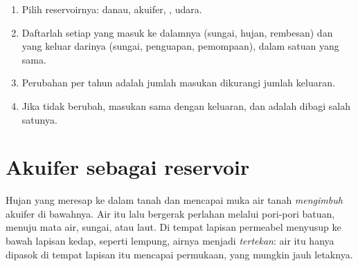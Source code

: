 \begin{method}\label{met:g10:freshwater-resources:budget}
\begin{enumerate}
  \item Pilih reservoirnya: danau, akuifer, , udara.
  \item Daftarlah setiap  yang masuk ke dalamnya (sungai, hujan,
        rembesan) dan yang keluar darinya (sungai, penguapan, pemompaan),
        dalam satuan yang sama.
  \item Perubahan  per tahun adalah jumlah masukan dikurangi jumlah
        keluaran.
  \item Jika  tidak berubah, masukan sama dengan keluaran, dan  adalah  dibagi salah satunya.
\end{enumerate}
\end{method}

\section{Akuifer sebagai reservoir}

Hujan yang meresap ke dalam tanah dan mencapai muka air tanah
\emph{mengimbuh} akuifer di bawahnya. Air itu lalu bergerak perlahan melalui
pori-pori batuan, menuju mata air, sungai, atau laut. Di tempat lapisan
permeabel menyusup ke bawah lapisan kedap, seperti lempung, airnya menjadi
\emph{tertekan}: air itu hanya dipasok di tempat lapisan itu mencapai
permukaan, yang mungkin jauh letaknya.

